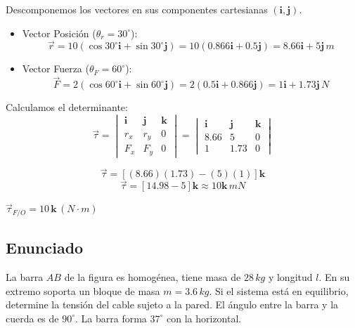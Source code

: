 \documentclass[12pt, a4paper]{article}
\begin{document}
Descomponemos los vectores en sus componentes cartesianas $(\mathbf{i}, \mathbf{j})$.
\begin{itemize}
    \item Vector Posición ($\theta_r = 30^\circ$):
    $$ \vec{r} = 10(\cos 30^\circ \mathbf{i} + \sin 30^\circ \mathbf{j}) = 10(0.866 \mathbf{i} + 0.5 \mathbf{j}) = 8.66 \mathbf{i} + 5 \mathbf{j} \, \si{m} $$
    \item Vector Fuerza ($\theta_F = 60^\circ$):
    $$ \vec{F} = 2(\cos 60^\circ \mathbf{i} + \sin 60^\circ \mathbf{j}) = 2(0.5 \mathbf{i} + 0.866 \mathbf{j}) = 1 \mathbf{i} + 1.73 \mathbf{j} \, \si{N} $$
\end{itemize}

Calculamos el determinante:
$$ \vec{\tau} = \begin{vmatrix} \mathbf{i} & \mathbf{j} & \mathbf{k} \\ r_x & r_y & 0 \\ F_x & F_y & 0 \end{vmatrix} = \begin{vmatrix} \mathbf{i} & \mathbf{j} & \mathbf{k} \\ 8.66 & 5 & 0 \\ 1 & 1.73 & 0 \end{vmatrix} $$

$$ \vec{\tau} = [ (8.66)(1.73) - (5)(1) ] \mathbf{k} $$
$$ \vec{\tau} = [ 14.98 - 5 ] \mathbf{k} \approx 10 \mathbf{k} \, \si{mN} $$

\begin{tcolorbox}[colback=blue!5!white, colframe=blue!50!black, title=Respuesta]
$\vec{\tau}_{F/O} = 10 \, \mathbf{k} \, (\si{N \cdot m})$
\end{tcolorbox}

\newpage


\subsection*{Enunciado}
La barra $AB$ de la figura es homogénea, tiene masa de $28 \, \si{kg}$ y longitud $l$. En su extremo soporta un bloque de masa $m = 3.6 \, \si{kg}$. Si el sistema está en equilibrio, determine la tensión del cable sujeto a la pared. El ángulo entre la barra y la cuerda es de $90^\circ$. La barra forma $37^\circ$ con la horizontal.
\end{document}
